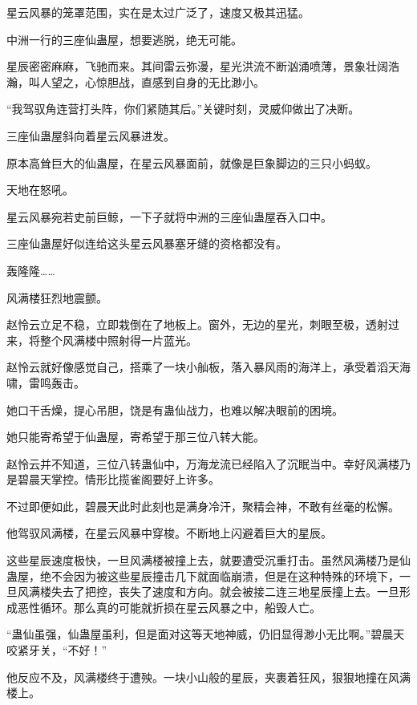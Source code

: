 
\begin{this_body}

星云风暴的笼罩范围，实在是太过广泛了，速度又极其迅猛。

中洲一行的三座仙蛊屋，想要逃脱，绝无可能。

星辰密密麻麻，飞驰而来。其间雷云弥漫，星光洪流不断汹涌喷薄，景象壮阔浩瀚，叫人望之，心惊胆战，直感到自身的无比渺小。

“我驾驭角连营打头阵，你们紧随其后。”关键时刻，灵威仰做出了决断。

三座仙蛊屋斜向着星云风暴进发。

原本高耸巨大的仙蛊屋，在星云风暴面前，就像是巨象脚边的三只小蚂蚁。

天地在怒吼。

星云风暴宛若史前巨鲸，一下子就将中洲的三座仙蛊屋吞入口中。

三座仙蛊屋好似连给这头星云风暴塞牙缝的资格都没有。

轰隆隆……

风满楼狂烈地震颤。

赵怜云立足不稳，立即栽倒在了地板上。窗外，无边的星光，刺眼至极，透射过来，将整个风满楼中照射得一片蓝光。

赵怜云就好像感觉自己，搭乘了一块小舢板，落入暴风雨的海洋上，承受着滔天海啸，雷鸣轰击。

她口干舌燥，提心吊胆，饶是有蛊仙战力，也难以解决眼前的困境。

她只能寄希望于仙蛊屋，寄希望于那三位八转大能。

赵怜云并不知道，三位八转蛊仙中，万海龙流已经陷入了沉眠当中。幸好风满楼乃是碧晨天掌控。情形比揽雀阁要好上许多。

不过即便如此，碧晨天此时此刻也是满身冷汗，聚精会神，不敢有丝毫的松懈。

他驾驭风满楼，在星云风暴中穿梭。不断地上闪避着巨大的星辰。

这些星辰速度极快，一旦风满楼被撞上去，就要遭受沉重打击。虽然风满楼乃是仙蛊屋，绝不会因为被这些星辰撞击几下就面临崩溃，但是在这种特殊的环境下，一旦风满楼失去了把控，丧失了速度和方向。就会被接二连三地星辰撞上去。一旦形成恶性循环。那么真的可能就折损在星云风暴之中，船毁人亡。

“蛊仙虽强，仙蛊屋虽利，但是面对这等天地神威，仍旧显得渺小无比啊。”碧晨天咬紧牙关，“不好！”

他反应不及，风满楼终于遭殃。一块小山般的星辰，夹裹着狂风，狠狠地撞在风满楼上。


\end{this_body}
